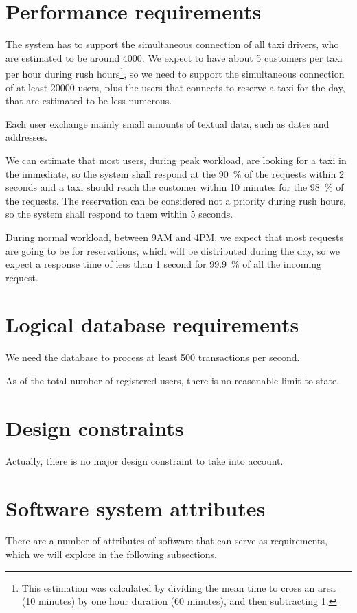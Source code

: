 \section{Performance requirements}
The system has to support the simultaneous connection of all taxi drivers, who are estimated to be around \num{4000}. We expect to have about \num{5} customers per taxi per hour during rush hours\footnote{This estimation was calculated by dividing the mean time to cross an area (\num{10} minutes) by one hour duration (\num{60} minutes), and then subtracting \num{1}.}, so we need to support the simultaneous connection of at least \num{20000} users, plus the users that connects to reserve a taxi for the day, that are estimated to be less numerous.

Each user exchange mainly small amounts of textual data, such as dates and addresses.

We can estimate that most users, during peak workload, are looking for a taxi in the immediate, so the system shall respond at the \SI{90}{\percent} of the requests within \num{2} seconds and a taxi should reach the customer within \num{10} minutes for the \SI{98}{\percent} of the requests. The reservation can be considered not a priority during rush hours, so the system shall respond to them within \num{5} seconds.

During normal workload, between 9AM and 4PM, we expect that most requests are going to be for reservations, which will be distributed during the day, so we expect a response time of less than \num{1} second for \SI{99,9}{\percent} of all the incoming request.


\section{Logical database requirements}\label{sec:database}
We need the database to process at least \num{500} transactions per second.

As of the total number of registered users, there is no reasonable limit to state.


\section{Design constraints}
Actually, there is no major design constraint to take into account.


\section{Software system attributes}
There are a number of attributes of software that can serve as requirements, which we will explore in the following subsections.

